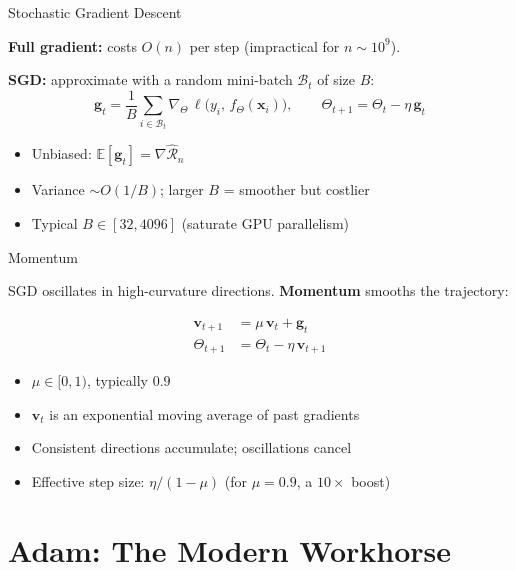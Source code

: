 \documentclass[aspectratio=169, professionalfonts]{beamer}
\def\E{\mathbb{E}}
\begin{document}
\begin{frame}{Stochastic Gradient Descent}

\textbf{Full gradient:} costs $O(n)$ per step (impractical for
$n \sim 10^9$).

\bigskip

\textbf{SGD:} approximate with a random mini-batch
$\mathcal{B}_t$ of size $B$:
$$\mathbf{g}_t
  = \frac{1}{B}\sum_{i \in \mathcal{B}_t}
    \nabla_\Theta\,\ell\!\bigl(y_i,\, f_\Theta(\mathbf{x}_i)\bigr),
  \qquad
  \Theta_{t+1} = \Theta_t - \eta\,\mathbf{g}_t$$

\begin{itemize}
  \item Unbiased: $\E[\mathbf{g}_t] = \nabla\hat{\mathcal{R}}_n$
  \item Variance $\sim O(1/B)$; larger $B$ = smoother but costlier
  \item Typical $B \in [32, 4096]$ (saturate GPU parallelism)
\end{itemize}

\end{frame}

\begin{frame}{Momentum}

SGD oscillates in high-curvature directions. \textbf{Momentum}
smooths the trajectory:

\begin{align*}
\mathbf{v}_{t+1} &= \mu\,\mathbf{v}_t + \mathbf{g}_t \\
\Theta_{t+1} &= \Theta_t - \eta\,\mathbf{v}_{t+1}
\end{align*}

\begin{itemize}
  \item $\mu \in [0,1)$, typically $0.9$
  \item $\mathbf{v}_t$ is an exponential moving average of past gradients
  \item Consistent directions accumulate; oscillations cancel
  \item Effective step size: $\eta/(1-\mu)$
        (for $\mu=0.9$, a $10\times$ boost)
\end{itemize}

\end{frame}

\section{Adam: The Modern Workhorse}
\end{document}
